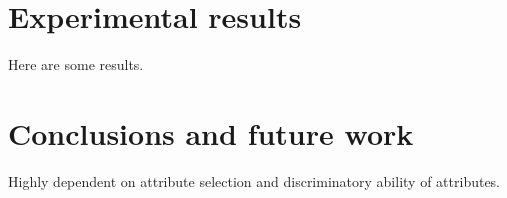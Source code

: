 \documentclass[10pt,twocolumn,letterpaper]{article}
\begin{document}
\section{Experimental results}
\label{sec:results}
Here are some results.

\section{Conclusions and future work}
\label{sec:conclusions}
Highly dependent on attribute selection and discriminatory ability of attributes.

{\small
%


}
\end{document}
